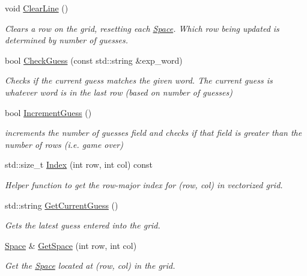 \begin{DoxyCompactItemize}
\mbox{\label{classgame_1_1objects_1_1Grid_ab5a78b3a32367cb685d4dcb501756d14}} 
void \hyperlink{classgame_1_1objects_1_1Grid_ab5a78b3a32367cb685d4dcb501756d14}{Clear\+Line} ()
\begin{DoxyCompactList}\small\item\em Clears a row on the grid, resetting each \hyperlink{classgame_1_1objects_1_1Space}{Space}. Which row being updated is determined by number of guesses. \end{DoxyCompactList}\item 
bool \hyperlink{classgame_1_1objects_1_1Grid_ad1cd48d90e6886a6bde6b1905319d8e5}{Check\+Guess} (const std\+::string \&exp\+\_\+word)
\begin{DoxyCompactList}\small\item\em Checks if the current guess matches the given word. The current guess is whatever word is in the last row (based on number of guesses) \end{DoxyCompactList}\item 
bool \hyperlink{classgame_1_1objects_1_1Grid_a8074b85524ccdff89f5a520699599f32}{Increment\+Guess} ()
\begin{DoxyCompactList}\small\item\em increments the number of guesses field and checks if that field is greater than the number of rows (i.\+e. game over) \end{DoxyCompactList}\item 
std\+::size\+\_\+t \hyperlink{classgame_1_1objects_1_1Grid_ad6a36b9043e9e5b5318149a9c7908933}{Index} (int row, int col) const
\begin{DoxyCompactList}\small\item\em Helper function to get the row-\/major index for (row, col) in vectorized grid. \end{DoxyCompactList}\item 
std\+::string \hyperlink{classgame_1_1objects_1_1Grid_af54fe43e853745e264a5b9e9b9e8e702}{Get\+Current\+Guess} ()
\begin{DoxyCompactList}\small\item\em Gets the latest guess entered into the grid. \end{DoxyCompactList}\item 
\hyperlink{classgame_1_1objects_1_1Space}{Space} \& \hyperlink{classgame_1_1objects_1_1Grid_a90aff1cebba7fa8de3d5dd452d59364c}{Get\+Space} (int row, int col)
\begin{DoxyCompactList}\small\item\em Get the \hyperlink{classgame_1_1objects_1_1Space}{Space} located at (row, col) in the grid. \end{DoxyCompactList}\item 

\end{DoxyCompactItemize}
